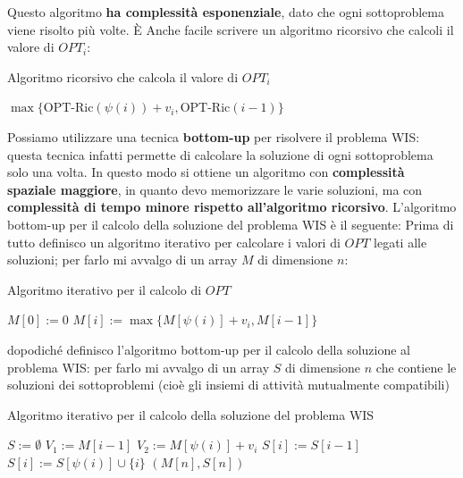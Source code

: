 \documentclass[12pt]{article}
\begin{document}
Questo algoritmo \textbf{ha complessità esponenziale}, dato che ogni sottoproblema viene risolto più volte. 
È Anche facile scrivere un algoritmo ricorsivo che calcoli il valore di $OPT_i$: \newline
\begin{algorithm}[H]
    \caption{Algoritmo ricorsivo che calcola il valore di $OPT_i$}
     {
         {
        } {
            \Return $\max \{\textrm{OPT-Ric}(\psi(i)) + v_i, \textrm{OPT-Ric}(i-1)\}$
        }
    }
\end{algorithm} \noindent
Possiamo utilizzare una tecnica \textbf{bottom-up} per risolvere il problema WIS: questa tecnica
infatti permette di calcolare la soluzione di ogni sottoproblema solo una volta. In questo modo si ottiene un algoritmo con \textbf{complessità spaziale maggiore}, in quanto devo memorizzare le varie soluzioni, ma con \textbf{complessità di tempo minore rispetto all'algoritmo ricorsivo}.
L'algoritmo bottom-up per il calcolo della soluzione del problema WIS è il seguente: \newline
Prima di tutto definisco un algoritmo iterativo per calcolare i valori di $OPT$ legati alle soluzioni; per farlo
mi avvalgo di un array $M$ di dimensione $n$: \newline
\begin{algorithm}[H]
    \caption{Algoritmo iterativo per il calcolo di $OPT$}
     {
        $M[0] := 0$ \;
         {
            $M[i] := \max\{M[\psi(i)] + v_i, M[i-1]\}$
        }
    }
\end{algorithm} \noindent
dopodiché definisco l'algoritmo bottom-up per il calcolo della soluzione al problema WIS: per farlo
mi avvalgo di un array $S$ di dimensione $n$ che contiene le soluzioni dei sottoproblemi (cioè gli insiemi di attività mutualmente compatibili) \newline
\begin{algorithm}[H]
    \caption{Algoritmo iterativo per il calcolo della soluzione del problema WIS}
     {
        $S := \emptyset$ \;
         {
            $V_1 := M[i-1]$ \;
            $V_2 := M[\psi(i)] + v_i$ \;
             {
                $S[i] := S[i-1]$
            } {
                $S[i] := S[\psi(i)] \cup \{i\}$
            }
        }
        \Return $(M[n], S[n])$
    }
\end{algorithm} \noindent
\end{document}
